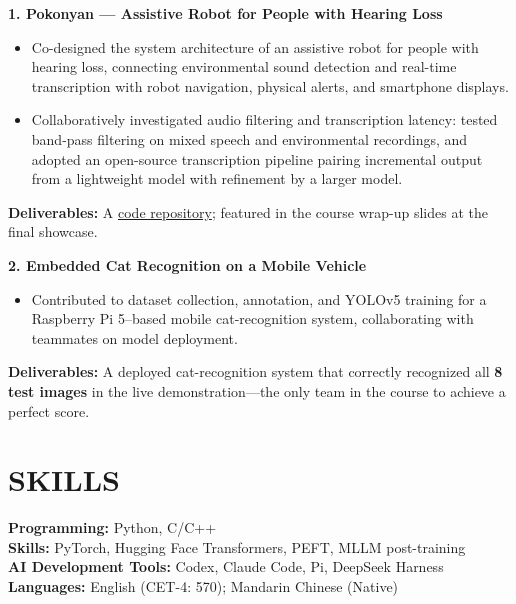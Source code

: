 \documentclass[10pt,a4paper]{article}
\begin{document}
\vspace{5pt}
\begin{list}{}{\setlength{\leftmargin}{10pt}\setlength{\rightmargin}{0pt}\setlength{\topsep}{0pt}}
\item[]
\textbf{1. Pokonyan --- Assistive Robot for People with Hearing Loss}
\begin{itemize}
\item Co-designed the system architecture of an assistive robot for people with hearing loss, connecting environmental sound detection and real-time transcription with robot navigation, physical alerts, and smartphone displays.
\item Collaboratively investigated audio filtering and transcription latency: tested band-pass filtering on mixed speech and environmental recordings, and adopted an open-source transcription pipeline pairing incremental output from a lightweight model with refinement by a larger model.
\end{itemize}
\textbf{Deliverables:} A \href{https://github.com/CherryPockyOvO/Pokonyan}{code repository}; featured in the course wrap-up slides at the final showcase.

\par\vspace{9pt}
\textbf{2. Embedded Cat Recognition on a Mobile Vehicle}
\begin{itemize}
\item Contributed to dataset collection, annotation, and YOLOv5 training for a Raspberry Pi 5--based mobile cat-recognition system, collaborating with teammates on model deployment.
\end{itemize}
\textbf{Deliverables:} A deployed cat-recognition system that correctly recognized all \textbf{8 test images} in the live demonstration---the only team in the course to achieve a perfect score.

\end{list}

\section{SKILLS}
\textbf{Programming:} Python, C/C++\\
\textbf{Skills:} PyTorch, Hugging Face Transformers, PEFT, MLLM post-training\\
\textbf{AI Development Tools:} Codex, Claude Code, Pi, DeepSeek Harness\\
\textbf{Languages:} English (CET-4: 570); Mandarin Chinese (Native)
\end{document}
